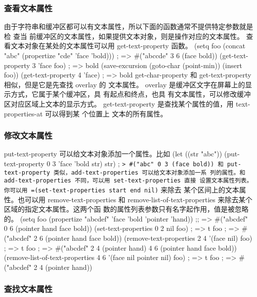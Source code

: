 \documentclass[11pt]{ctexart}
\begin{document}
{{{{\subsubsection{查看文本属性}
\label{sec:org85e2b86}

由于字符串和缓冲区都可以有文本属性，所以下面的函数通常不提供特定参数就是检 查当
前缓冲区的文本属性，如果提供文本对象，则是操作对应的文本属性。
查看文本对象在某处的文本属性可以用 get-text-property 函数。
(setq foo (concat "abc"
(propertize "cde" 'face 'bold))) ; => \#("abccde" 3 6 (face bold))
(get-text-property 3 'face foo)                    ; => bold
(save-excursion
(goto-char (point-min))
(insert foo))
(get-text-property 4 'face)                        ; => bold
get-char-property 和 get-text-property 相似，但是它是先查找 overlay 的 文本属性。
overlay 是缓冲区文字在屏幕上的显示方式，它属于某个缓冲区，具 有起点和终点，也具
有文本属性，可以修改缓冲区对应区域上文本的显示方式。
get-text-property 是查找某个属性的值，用 text-properties-at 可以得到某 个位置上
文本的所有属性。

\subsubsection{修改文本属性}
\label{sec:org4ded085}

put-text-property 可以给文本对象添加一个属性。比如
(let ((str "abc"))
(put-text-property 0 3 'face 'bold str)
str)                                  ; \texttt{> \#("abc" 0 3 (face bold))
     和 put-text-property 类似，add-text-properties 可以给文本对象添加一系 列的属性。和 add-text-properties 不同，可以用 set-text-properties 直接 设置文本属性列表。你可以用 =(set-text-properties start end nil)} 来除去 某个区间上的文本属性。也可以用 remove-text-properties 和 remove-list-of-text-properties 来除去某个区域的指定文本属性。这两个函 数的属性列表参数只有名字起作用，值是被忽略的。
(setq foo (propertize "abcdef" 'face 'bold
'pointer 'hand))
;; => \#("abcdef" 0 6 (pointer hand face bold))
(set-text-properties 0 2 nil foo)       ; => t
foo   ; => \#("abcdef" 2 6 (pointer hand face bold))
(remove-text-properties 2 4 '(face nil) foo) ; => t
foo   ; => \#("abcdef" 2 4 (pointer hand) 4 6 (pointer hand face bold))
(remove-list-of-text-properties 4 6 '(face nil pointer nil) foo) ; => t
foo   ; => \#("abcdef" 2 4 (pointer hand))

\subsubsection{查找文本属性}
\label{sec:orgcd60c2e}

}}}}
\end{document}
